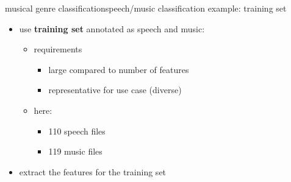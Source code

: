         \begin{frame}{musical genre classification}{speech/music classification example: training set}
            \begin{itemize}
                \item	use \textbf{training set} annotated as speech and music:
                    \begin{itemize}
                        \item	requirements
                            \begin{itemize}
                                \item	large compared to number of features
                                \item	representative for use case (diverse)
                            \end{itemize}
                        \item	here:
                            \begin{itemize}
                                \item	110 speech files
                                \item	119 music files
                            \end{itemize}
                    \end{itemize}
                \item	extract the features for the training set
            \end{itemize}
        \end{frame}

